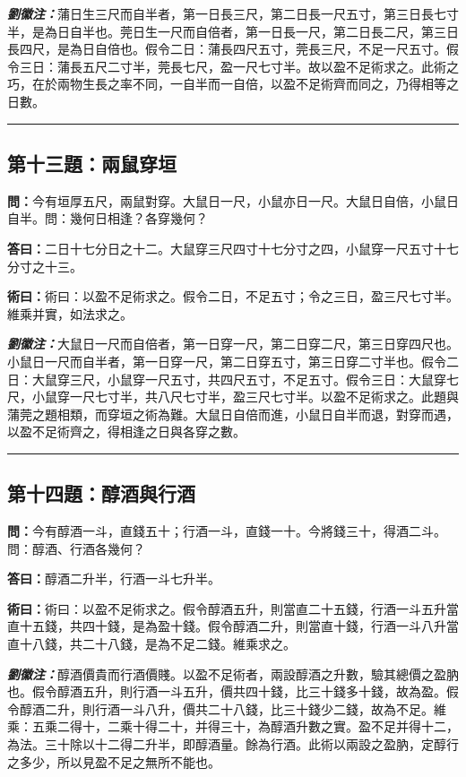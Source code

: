 \documentclass[11pt,a4paper]{article}
\newcommand{\wen}[1]{\textbf{\color{problemcolor}問：}#1\par}
\newcommand{\da}[1]{\textbf{答曰：}#1\par}
\newcommand{\shu}[1]{\textbf{術曰：}#1\par}
\newcommand{\liuhui}[1]{{\color{commentarycolor}\textit{\textbf{劉徽注：}}#1\par}}
\begin{document}
\liuhui{蒲日生三尺而自半者，第一日長三尺，第二日長一尺五寸，第三日長七寸半，是為日自半也。莞日生一尺而自倍者，第一日長一尺，第二日長二尺，第三日長四尺，是為日自倍也。假令二日：蒲長四尺五寸，莞長三尺，不足一尺五寸。假令三日：蒲長五尺二寸半，莞長七尺，盈一尺七寸半。故以盈不足術求之。此術之巧，在於兩物生長之率不同，一自半而一自倍，以盈不足術齊而同之，乃得相等之日數。}

\bigskip
\hrule
\bigskip

\subsection{第十三題：兩鼠穿垣}

\wen{今有垣厚五尺，兩鼠對穿。大鼠日一尺，小鼠亦日一尺。大鼠日自倍，小鼠日自半。問：幾何日相逢？各穿幾何？}

\da{二日十七分日之十二。大鼠穿三尺四寸十七分寸之四，小鼠穿一尺五寸十七分寸之十三。}

\shu{術曰：以盈不足術求之。假令二日，不足五寸；令之三日，盈三尺七寸半。維乘并實，如法求之。}

\liuhui{大鼠日一尺而自倍者，第一日穿一尺，第二日穿二尺，第三日穿四尺也。小鼠日一尺而自半者，第一日穿一尺，第二日穿五寸，第三日穿二寸半也。假令二日：大鼠穿三尺，小鼠穿一尺五寸，共四尺五寸，不足五寸。假令三日：大鼠穿七尺，小鼠穿一尺七寸半，共八尺七寸半，盈三尺七寸半。以盈不足術求之。此題與蒲莞之題相類，而穿垣之術為難。大鼠日自倍而進，小鼠日自半而退，對穿而遇，以盈不足術齊之，得相逢之日與各穿之數。}

\bigskip
\hrule
\bigskip

\subsection{第十四題：醇酒與行酒}

\wen{今有醇酒一斗，直錢五十；行酒一斗，直錢一十。今將錢三十，得酒二斗。問：醇酒、行酒各幾何？}

\da{醇酒二升半，行酒一斗七升半。}

\shu{術曰：以盈不足術求之。假令醇酒五升，則當直二十五錢，行酒一斗五升當直十五錢，共四十錢，是為盈十錢。假令醇酒二升，則當直十錢，行酒一斗八升當直十八錢，共二十八錢，是為不足二錢。維乘求之。}

\liuhui{醇酒價貴而行酒價賤。以盈不足術者，兩設醇酒之升數，驗其總價之盈肭也。假令醇酒五升，則行酒一斗五升，價共四十錢，比三十錢多十錢，故為盈。假令醇酒二升，則行酒一斗八升，價共二十八錢，比三十錢少二錢，故為不足。維乘：五乘二得十，二乘十得二十，并得三十，為醇酒升數之實。盈不足并得十二，為法。三十除以十二得二升半，即醇酒量。餘為行酒。此術以兩設之盈肭，定醇行之多少，所以見盈不足之無所不能也。}
\end{document}

